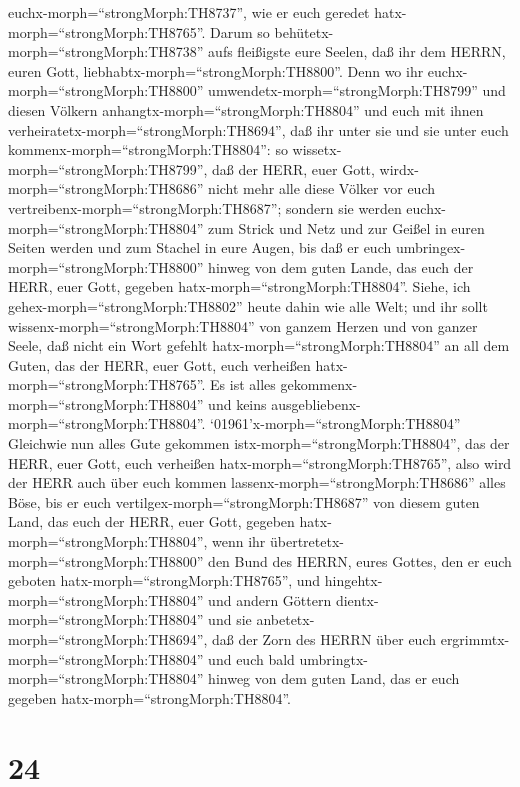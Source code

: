 euchx-morph=``strongMorph:TH8737'', wie er euch geredet
hatx-morph=``strongMorph:TH8765''.  Darum so
behütetx-morph=``strongMorph:TH8738'' aufs fleißigste eure Seelen, daß
ihr dem HERRN, euren Gott, liebhabtx-morph=``strongMorph:TH8800''.
 Denn wo ihr euchx-morph=``strongMorph:TH8800''
umwendetx-morph=``strongMorph:TH8799'' und diesen Völkern
anhangtx-morph=``strongMorph:TH8804'' und euch mit ihnen
verheiratetx-morph=``strongMorph:TH8694'', daß ihr unter sie und sie
unter euch kommenx-morph=``strongMorph:TH8804'':  so
wissetx-morph=``strongMorph:TH8799'', daß der HERR, euer Gott,
wirdx-morph=``strongMorph:TH8686'' nicht mehr alle diese Völker vor euch
vertreibenx-morph=``strongMorph:TH8687''; sondern sie werden
euchx-morph=``strongMorph:TH8804'' zum Strick und Netz und zur Geißel in
euren Seiten werden und zum Stachel in eure Augen, bis daß er euch
umbringex-morph=``strongMorph:TH8800'' hinweg von dem guten Lande, das
euch der HERR, euer Gott, gegeben hatx-morph=``strongMorph:TH8804''.
 Siehe, ich gehex-morph=``strongMorph:TH8802'' heute dahin
wie alle Welt; und ihr sollt wissenx-morph=``strongMorph:TH8804'' von
ganzem Herzen und von ganzer Seele, daß nicht ein Wort gefehlt
hatx-morph=``strongMorph:TH8804'' an all dem Guten, das der HERR, euer
Gott, euch verheißen hatx-morph=``strongMorph:TH8765''. Es ist alles
gekommenx-morph=``strongMorph:TH8804'' und keins
ausgebliebenx-morph=``strongMorph:TH8804''. 
`01961'\textbar x-morph=``strongMorph:TH8804'' Gleichwie nun alles Gute
gekommen istx-morph=``strongMorph:TH8804'', das der HERR, euer Gott,
euch verheißen hatx-morph=``strongMorph:TH8765'', also wird der HERR
auch über euch kommen lassenx-morph=``strongMorph:TH8686'' alles Böse,
bis er euch vertilgex-morph=``strongMorph:TH8687'' von diesem guten
Land, das euch der HERR, euer Gott, gegeben
hatx-morph=``strongMorph:TH8804'',  wenn ihr
übertretetx-morph=``strongMorph:TH8800'' den Bund des HERRN, eures
Gottes, den er euch geboten hatx-morph=``strongMorph:TH8765'', und
hingehtx-morph=``strongMorph:TH8804'' und andern Göttern
dientx-morph=``strongMorph:TH8804'' und sie
anbetetx-morph=``strongMorph:TH8694'', daß der Zorn des HERRN über euch
ergrimmtx-morph=``strongMorph:TH8804'' und euch bald
umbringtx-morph=``strongMorph:TH8804'' hinweg von dem guten Land, das er
euch gegeben hatx-morph=``strongMorph:TH8804''.

\hypertarget{section-23}{%
\section{24}\label{section-23}}

